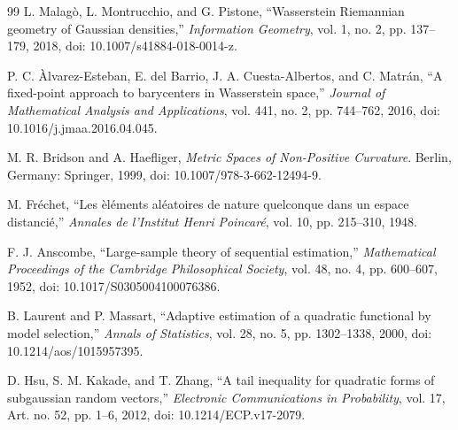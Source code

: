 \documentclass[11pt,a4paper]{article}
\theoremstyle{remark}
\begin{document}
\begin{thebibliography}{99}
L. Malag\`o, L. Montrucchio, and G. Pistone, ``Wasserstein Riemannian geometry of Gaussian densities,'' \emph{Information Geometry}, vol. 1, no. 2, pp. 137--179, 2018, doi: 10.1007/s41884-018-0014-z.

P. C. \`Alvarez-Esteban, E. del Barrio, J. A. Cuesta-Albertos, and C. Matr\'an, ``A fixed-point approach to barycenters in Wasserstein space,'' \emph{Journal of Mathematical Analysis and Applications}, vol. 441, no. 2, pp. 744--762, 2016, doi: 10.1016/j.jmaa.2016.04.045.

M. R. Bridson and A. Haefliger, \emph{Metric Spaces of Non-Positive Curvature}. Berlin, Germany: Springer, 1999, doi: 10.1007/978-3-662-12494-9.

M. Fr\'echet, ``Les \`el\'ements al\'eatoires de nature quelconque dans un espace distanci\'e,'' \emph{Annales de l'Institut Henri Poincar\'e}, vol. 10, pp. 215--310, 1948.

F. J. Anscombe, ``Large-sample theory of sequential estimation,'' \emph{Mathematical Proceedings of the Cambridge Philosophical Society}, vol. 48, no. 4, pp. 600--607, 1952, doi: 10.1017/S0305004100076386.

B. Laurent and P. Massart, ``Adaptive estimation of a quadratic functional by model selection,'' \emph{Annals of Statistics}, vol. 28, no. 5, pp. 1302--1338, 2000, doi: 10.1214/aos/1015957395.

D. Hsu, S. M. Kakade, and T. Zhang, ``A tail inequality for quadratic forms of subgaussian random vectors,'' \emph{Electronic Communications in Probability}, vol. 17, Art. no. 52, pp. 1--6, 2012, doi: 10.1214/ECP.v17-2079.

\end{thebibliography}
\end{document}
